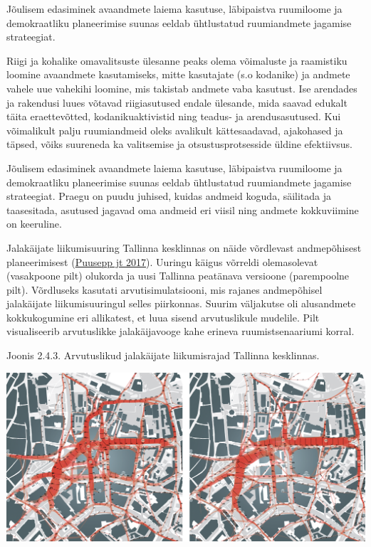 \documentclass[estonian,]{article}
\begin{document}
\begin{blockquote-right}
Jõulisem edasiminek avaandmete laiema kasutuse, läbipaistva ruumiloome
ja demokraatliku planeerimise suunas eeldab ühtlustatud ruumiandmete
jagamise strateegiat.
\end{blockquote-right}

Riigi ja kohalike omavalitsuste ülesanne peaks olema võimaluste ja raamistiku loomine avaandmete kasutamiseks, mitte kasutajate (s.o kodanike) ja andmete vahele uue vahekihi loomine, mis takistab andmete vaba kasutust. Ise arendades ja rakendusi luues võtavad riigiasutused endale ülesande, mida saavad edukalt täita eraettevõtted, kodanikuaktivistid ning teadus- ja arendusasutused. Kui võimalikult palju ruumiandmeid oleks avalikult kättesaadavad, ajakohased ja täpsed, võiks suureneda ka valitsemise ja otsustusprotsesside üldine efektiivsus.

Jõulisem edasiminek avaandmete laiema kasutuse, läbipaistva ruumiloome ja demokraatliku planeerimise suunas eeldab ühtlustatud ruumiandmete jagamise strateegiat. Praegu on puudu juhised, kuidas andmeid koguda, säilitada ja taasesitada, asutused jagavad oma andmeid eri viisil ning andmete kokkuviimine on keeruline.

Jalakäijate liikumisuuring Tallinna kesklinnas on näide võrdlevast andmepõhisest planeerimisest (\protect\hyperlink{Puusepp2017}{Puusepp jt 2017}). Uuringu käigus võrreldi olemasolevat (vasakpoone pilt) olukorda ja uusi Tallinna peatänava versioone (parempoolne pilt). Võrdluseks kasutati arvutisimulatsiooni, mis rajanes andmepõhisel jalakäijate liikumisuuringul selles piirkonnas. Suurim väljakutse oli alusandmete kokkukogumine eri allikatest, et luua sisend arvutuslikule mudelile. Pilt visualiseerib arvutuslikke jalakäijavooge kahe erineva ruumistsenaariumi korral.

{Joonis 2.4.3.} Arvutuslikud jalakäijate liikumisrajad Tallinna kesklinnas.

\begin{center}\includegraphics[width=0.9\linewidth]{figures/2-chapter/fig243} \end{center}
\end{document}
